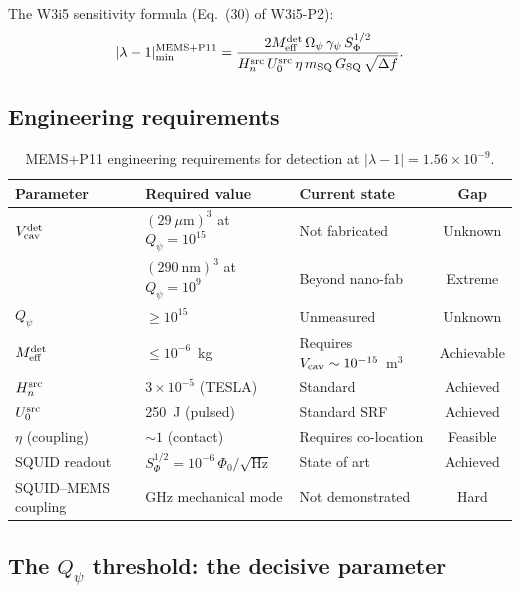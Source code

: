 \documentclass[11pt]{article}
\newcommand{\lam}{\lambda}
\newcommand{\Opsi}{\Omega_\psi}
\newcommand{\gpsi}{\gamma_\psi}
\newcommand{\Meff}{M_{\rm eff}}
\newcommand{\ee}[1]{\times 10^{#1}}
\newcommand{\Qpsi}{Q_\psi}
\newcommand{\Heff}{H_n}
\newcommand{\Vcav}{V_{\rm cav}}
\newcommand{\lbone}{|\lam - 1|}
\theoremstyle{definition}
\theoremstyle{remark}
\begin{document}
The W3i5 sensitivity formula (Eq.~(30) of W3i5-P2):
\begin{equation}
|\lam-1|_{\rm min}^{\rm MEMS+P11}
= \frac{2\Meff^{\rm det}\,\Opsi\,\gpsi\,S_\Phi^{1/2}}
{\Heff^{\rm src}\,U_0^{\rm src}\,\eta\,m_{\rm SQ}\,G_{\rm SQ}\,\sqrt{\Delta f}}.
\label{eq:MEMS_P11_sensitivity}
\end{equation}

\subsection{Engineering requirements}
\label{ssec:engineering_requirements}

\begin{table}[H]
\centering
\caption{MEMS+P11 engineering requirements for detection at $\lbone = 1.56\ee{-9}$.}
\label{tab:MEMS_requirements}
\renewcommand{\arraystretch}{1.2}
\begin{tabular}{@{}lllc@{}}
\toprule
\textbf{Parameter} & \textbf{Required value} & \textbf{Current state} &
  \textbf{Gap} \\
\midrule
$\Vcav^{\rm det}$ & $(29~\mu\text{m})^3$ at $\Qpsi = 10^{15}$
  & Not fabricated & Unknown \\
 & $(290~\text{nm})^3$ at $\Qpsi = 10^{9}$
  & Beyond nano-fab & Extreme \\
$\Qpsi$ & $\geq 10^{15}$ & Unmeasured & Unknown \\
$\Meff^{\rm det}$ & $\leq 10^{-6}$~kg & Requires $\Vcav \sim 10^{-15}$~m$^3$
  & Achievable \\
$\Heff^{\rm src}$ & $3\ee{-5}$ (TESLA) & Standard & Achieved \\
$U_0^{\rm src}$ & 250~J (pulsed) & Standard SRF & Achieved \\
$\eta$ (coupling) & $\sim 1$ (contact) & Requires co-location & Feasible \\
SQUID readout & $S_\Phi^{1/2} = 10^{-6}\,\Phi_0/\sqrt{\text{Hz}}$
  & State of art & Achieved \\
SQUID--MEMS coupling & GHz mechanical mode & Not demonstrated & Hard \\
\bottomrule
\end{tabular}
\end{table}

\subsection{The $\Qpsi$ threshold: the decisive parameter}
\label{ssec:Qpsi_threshold}
\end{document}
